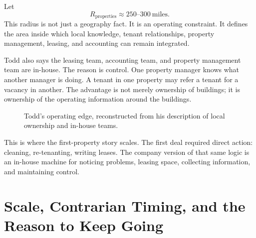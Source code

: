 Let
\begin{equation}
R_{\mathrm{properties}}\approx 250\text{--}300\ \mathrm{miles}.
\end{equation}
This radius is not just a geography fact. It is an operating constraint. It defines the area inside which local knowledge, tenant relationships, property management, leasing, and accounting can remain integrated.

Todd also says the leasing team, accounting team, and property management team are in-house. The reason is control. One property manager knows what another manager is doing. A tenant in one property may refer a tenant for a vacancy in another. The advantage is not merely ownership of buildings; it is ownership of the operating information around the buildings.

\begin{figure}
\centering
{}
\caption{Todd's operating edge, reconstructed from his description of local ownership and in-house teams.}
\end{figure}

This is where the first-property story scales. The first deal required direct action: cleaning, re-tenanting, writing leases. The company version of that same logic is an in-house machine for noticing problems, leasing space, collecting information, and maintaining control.

\section{Scale, Contrarian Timing, and the Reason to Keep Going}

